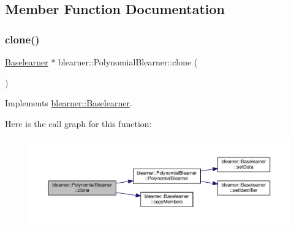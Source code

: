 \subsection{Member Function Documentation}
\mbox{\label{classblearner_1_1_polynomial_blearner_a4a93ace818c330e5d1f572108ba061c0}} 
\subsubsection{\texorpdfstring{clone()}{clone()}}
{\footnotesize\ttfamily \mbox{\hyperlink{classblearner_1_1_baselearner}{Baselearner}} $\ast$ blearner\+::\+Polynomial\+Blearner\+::clone (\begin{DoxyParamCaption}{ }\end{DoxyParamCaption})\hspace{0.3cm}{\ttfamily [virtual]}}



Implements \mbox{\hyperlink{classblearner_1_1_baselearner_a8e12c6739f085917a7d2da6570c51a21}{blearner\+::\+Baselearner}}.

Here is the call graph for this function\+:\nopagebreak
\begin{figure}[H]
\begin{center}
\leavevmode
\includegraphics[width=350pt]{classblearner_1_1_polynomial_blearner_a4a93ace818c330e5d1f572108ba061c0_cgraph}
\end{center}
\end{figure}
\mbox{\label{classblearner_1_1_polynomial_blearner_a5d3a44e8a4a8155ac24ee05e2c68af75}} 
